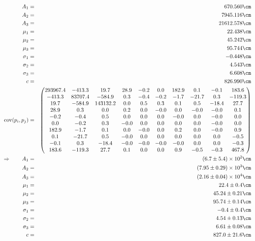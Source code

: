 
\begin{eqnarray}
    A_1 &=& 670.560 \cm \nonumber \\
    A_2 &=& 7945.116 \cm \nonumber \\
    A_3 &=& 21612.578 \cm \nonumber \\
    \mu_1 &=& 22.438 \cm \nonumber \\
    \mu_2 &=& 45.242 \cm \nonumber \\
    \mu_3 &=& 95.744 \cm \nonumber \\
    \sigma_1 &=& -0.448 \cm \nonumber \\
    \sigma_2 &=& 4.543 \cm \nonumber \\
    \sigma_3 &=& 6.608 \cm \nonumber \\
    c &=& 826.990 \cm \nonumber \\
    \mathrm{cov}(p_i, p_j) &=& 
    \begin{pmatrix}
        293967.4 &-413.3 &19.7 &28.9 &-0.2 &0.0 &182.9 &0.1 &-0.1 &183.6 \\
        -413.3 &83707.4 &-584.9 &0.3 &-0.4 &-0.2 &-1.7 &-21.7 &0.3 &-119.3 \\
        19.7 &-584.9 &143132.2 &0.0 &0.5 &0.3 &0.1 &0.5 &-18.4 &27.7 \\
        28.9 &0.3 &0.0 &0.2 &0.0 &-0.0 &0.0 &-0.0 &-0.0 &0.1 \\
        -0.2 &-0.4 &0.5 &0.0 &0.0 &0.0 &-0.0 &0.0 &-0.0 &0.0 \\
        0.0 &-0.2 &0.3 &-0.0 &0.0 &0.0 &0.0 &0.0 &-0.0 &0.0 \\
        182.9 &-1.7 &0.1 &0.0 &-0.0 &0.0 &0.2 &0.0 &-0.0 &0.9 \\
        0.1 &-21.7 &0.5 &-0.0 &0.0 &0.0 &0.0 &0.0 &0.0 &-0.5 \\
        -0.1 &0.3 &-18.4 &-0.0 &-0.0 &-0.0 &-0.0 &0.0 &0.0 &-0.3 \\
        183.6 &-119.3 &27.7 &0.1 &0.0 &0.0 &0.9 &-0.5 &-0.3 &467.8 \\
    \end{pmatrix}
\\ \Rightarrow \qquad
    A_1 &=& \left(6.7 \pm 5.4\right) \times 10^{2} \cm\\
    A_2 &=& \left(7.95 \pm 0.29\right) \times 10^{3} \cm\\
    A_3 &=& \left(2.16 \pm 0.04\right) \times 10^{4} \cm\\
    \mu_1 &=& 22.4 \pm 0.4 \cm\\
    \mu_2 &=& 45.24 \pm 0.21 \cm\\
    \mu_3 &=& 95.74 \pm 0.14 \cm\\
    \sigma_1 &=& -0.4 \pm 0.4 \cm\\
    \sigma_2 &=& 4.54 \pm 0.13 \cm\\
    \sigma_3 &=& 6.61 \pm 0.08 \cm\\
    c &=& 827.0 \pm 21.6 \cm
\end{eqnarray}

